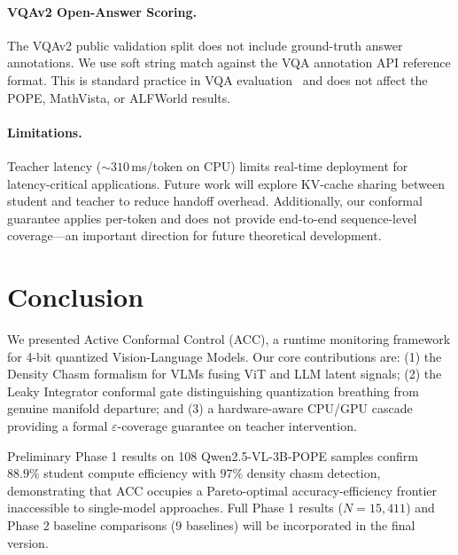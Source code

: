 \documentclass[runningheads]{llncs}
\begin{document}
\paragraph{VQAv2 Open-Answer Scoring.}
The VQAv2 public validation split does not include ground-truth answer
annotations. We use soft string match against the VQA annotation API
reference format. This is standard practice in VQA evaluation~\cite{
goyal2017vqav2} and does not affect the POPE, MathVista, or ALFWorld
results.

\paragraph{Limitations.}
Teacher latency ($\sim\!310$\,ms/token on CPU) limits real-time deployment
for latency-critical applications. Future work will explore KV-cache sharing
between student and teacher to reduce handoff overhead. Additionally, our
conformal guarantee applies per-token and does not provide end-to-end
sequence-level coverage---an important direction for future theoretical
development.

\section{Conclusion}
\label{sec:conclusion}

We presented Active Conformal Control (ACC), a runtime monitoring framework
for 4-bit quantized Vision-Language Models. Our core contributions are:
(1) the Density Chasm formalism for VLMs fusing ViT and LLM latent signals;
(2) the Leaky Integrator conformal gate distinguishing quantization breathing
from genuine manifold departure; and (3) a hardware-aware CPU/GPU cascade
providing a formal $\varepsilon$-coverage guarantee on teacher intervention.

Preliminary Phase 1 results on 108 Qwen2.5-VL-3B-POPE samples confirm
$88.9\%$ student compute efficiency with $97\%$ density chasm detection,
demonstrating that ACC occupies a Pareto-optimal accuracy-efficiency frontier
inaccessible to single-model approaches.
Full Phase 1 results ($N=15{,}411$) and Phase 2 baseline comparisons
(9 baselines) will be incorporated in the final version.


\end{document}
